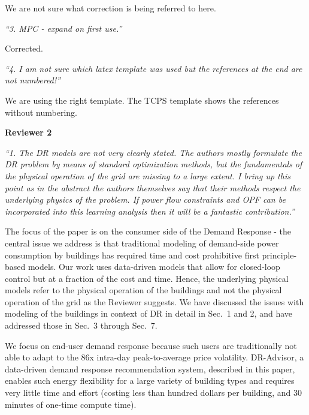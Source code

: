 \documentclass[11pt]{article}
\begin{document}
\vspace*{0.25cm}
\color{blue}
\noindent We are not sure what correction is being referred to here.
\color{black}

\vspace*{0.5cm}
\noindent \emph{``3. MPC - expand on first use.''}

\color{blue}
\vspace*{0.25cm}
\noindent Corrected.
\color{black}

\vspace*{0.5cm}
\noindent \emph{``4. I am not sure which latex template was used but the references at the end are not numbered!''}

\color{blue}
\vspace*{0.25cm}
\noindent We are using the right template. The TCPS template shows the references without numbering.
\color{black}

\vspace*{0.5cm}
\noindent \textbf{Reviewer 2}

\vspace*{0.5cm}
\noindent\emph{``1. The DR models are not very clearly stated. The authors mostly formulate the DR problem by means of standard optimization methods, but the fundamentals of the physical operation of the grid are missing to a large extent. I bring up this point as in the abstract the authors themselves say that their methods respect the underlying physics of the problem. If power flow constraints and OPF can be incorporated into this learning analysis then it will be a fantastic contribution.''}

\color{blue}
\vspace*{0.25cm}
\noindent The focus of the paper is on the consumer side of the Demand Response - the central issue we address is that traditional modeling of demand-side power consumption by buildings has required time and cost prohibitive first principle-based models. Our work uses data-driven models that allow for closed-loop control but at a fraction of the cost and time. Hence, the underlying physical models refer to the physical operation of the buildings and not the physical operation of the grid as the Reviewer suggests. We have discussed the issues with modeling of the buildings in context of DR in detail in Sec.~1 and 2, and have addressed those in Sec.~3 through Sec.~7.

We focus on end-user demand response because such users are traditionally not able to adapt to the 86x intra-day peak-to-average price volatility. DR-Advisor, a data-driven demand response recommendation system, described in this paper, enables such energy flexibility for a large variety of building types and requires very little time and effort (costing less than hundred dollars per building, and 30 minutes of one-time compute time).  
\color{black}
\end{document}
